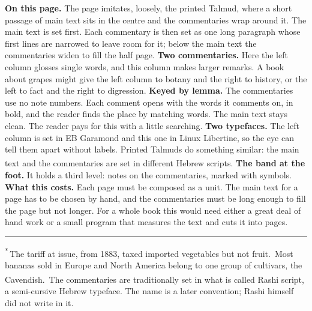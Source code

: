 \documentclass[11pt]{article}
\newcommand\lemma[1]{\textbf{#1}}           %
\newcommand\cmark[1]{\textsuperscript{#1}}  %
\begin{document}
{\lemma{On this page.} The page imitates, loosely, the printed Talmud, where a
short passage of main text sits in the centre and the commentaries wrap
around it. The main text is set first. Each commentary is then set as one
long paragraph whose first lines are narrowed to leave room for it; below the
main text the commentaries widen to fill the half page. \lemma{Two
commentaries.} Here the left column glosses single words, and this column
makes larger remarks. A book about grapes might give the left column to
botany and the right to history, or the left to fact and the right to
digression. \lemma{Keyed by lemma.} The commentaries use no note numbers.
Each comment opens with the words it comments on, in bold, and the reader
finds the place by matching words. The main text stays clean. The reader pays
for this with a little searching. \lemma{Two typefaces.} The left column is
set in EB Garamond and this one in Linux Libertine, so the eye can tell them
apart without labels. Printed Talmuds do something similar: the main text and
the commentaries are set in different Hebrew scripts.\cmark{\ddag}
\lemma{The band at the foot.} It holds a third level: notes on the
commentaries, marked with symbols. \lemma{What this costs.} Each page must be
composed as a unit. The main text for a page has to be chosen by hand, and the
commentaries must be long enough to fill the page but not longer. For a whole
book this would need either a great deal of hand work or a small program that
measures the text and cuts it into pages.}

\vfill
\noindent\rule{\textwidth}{0.3pt}\par\vspace{3pt}
{\fontsize{8}{9.6}\selectfont
\cmark{*}\,The tariff at issue, from 1883, taxed imported vegetables but not
fruit. \quad
\cmark{\dag}\,Most bananas sold in Europe and North America belong to one
group of cultivars, the Cavendish. \quad
\cmark{\ddag}\,The commentaries are traditionally set in what is called Rashi
script, a semi-cursive Hebrew typeface. The name is a later convention; Rashi
himself did not write in it.\par}
\end{document}
